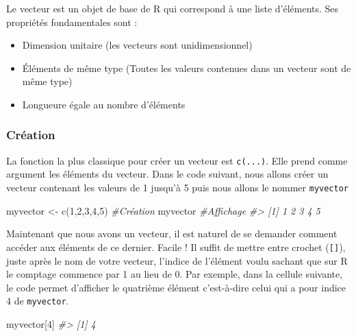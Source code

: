 \documentclass[
]{book}
\newenvironment{Shaded}{\begin{snugshade}}{\end{snugshade}}
\newcommand{\CommentTok}[1]{\textcolor[rgb]{0.56,0.35,0.01}{\textit{#1}}}
\newcommand{\DecValTok}[1]{\textcolor[rgb]{0.00,0.00,0.81}{#1}}
\newcommand{\FunctionTok}[1]{\textcolor[rgb]{0.00,0.00,0.00}{#1}}
\newcommand{\NormalTok}[1]{#1}
\newcommand{\OtherTok}[1]{\textcolor[rgb]{0.56,0.35,0.01}{#1}}
\providecommand{\tightlist}{%
  \setlength{\itemsep}{0pt}\setlength{\parskip}{0pt}}
\theoremstyle{definition}
\theoremstyle{definition}
\theoremstyle{definition}
\theoremstyle{definition}
\theoremstyle{remark}
\begin{document}
Le vecteur est un objet de base de R qui correspond à une liste d'éléments. Ses propriétés fondamentales sont :

\begin{itemize}
\tightlist
\item
  Dimension unitaire (les vecteurs sont unidimensionnel)\\
\item
  Éléments de même type (Toutes les valeurs contenues dans un vecteur sont de même type)\\
\item
  Longueure égale au nombre d'éléments
\end{itemize}

\hypertarget{cruxe9ation}{%
\subsubsection*{Création}\label{cruxe9ation}}

La fonction la plus classique pour créer un vecteur est \texttt{c(...)}. Elle prend comme argument les éléments du vecteur. Dans le code suivant, nous allons créer un vecteur contenant les valeurs de 1 jusqu'à 5 puis nous allons le nommer \texttt{myvector}

\begin{Shaded}
\begin{Highlighting}[]
\NormalTok{myvector }\OtherTok{\textless{}{-}} \FunctionTok{c}\NormalTok{(}\DecValTok{1}\NormalTok{,}\DecValTok{2}\NormalTok{,}\DecValTok{3}\NormalTok{,}\DecValTok{4}\NormalTok{,}\DecValTok{5}\NormalTok{) }\CommentTok{\#Création}
\NormalTok{myvector }\CommentTok{\#Affichage}
\CommentTok{\#\textgreater{} [1] 1 2 3 4 5}
\end{Highlighting}
\end{Shaded}

Maintenant que nous avons un vecteur, il est naturel de se demander comment accéder aux éléments de ce dernier. Facile ! Il suffit de mettre entre crochet (\texttt{{[}{]}}), juste après le nom de votre vecteur, l'indice de l'élément voulu sachant que sur R le comptage commence par 1 au lieu de 0. Par exemple, dans la cellule suivante, le code permet d'afficher le quatrième élément c'est-à-dire celui qui a pour indice 4 de \texttt{myvector}.

\begin{Shaded}
\begin{Highlighting}[]
\NormalTok{myvector[}\DecValTok{4}\NormalTok{]}
\CommentTok{\#\textgreater{} [1] 4}
\end{Highlighting}
\end{Shaded}
\end{document}

